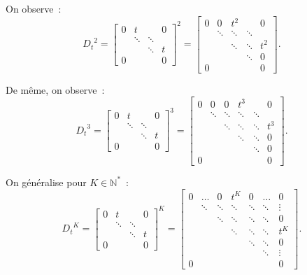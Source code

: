 \documentclass{report}
\theoremstyle{definition}
\theoremstyle{remark}
\numberwithin{equation}{section}
\newcommand{\N}{\mathbb N}
\newcommand{\Ns}{\N^{*}}
\begin{document}
			On observe~:
			\begin{equation}
				{D_t}^2 =
			\begin{bmatrix}
				0 & t & & 0 \\
				  & \ddots & \ddots & \\
				  & & \ddots & t \\
				0 & & & 0
			\end{bmatrix}^2 =
			\begin{bmatrix}
				0 & 0 & t^2 & & 0 \\
				& \ddots & \ddots & \ddots & \\
				& & \ddots & \ddots & t^2 \\
				& & & \ddots & 0 \\
				0 & & & & 0
			\end{bmatrix}.
			\end{equation}

			De même, on observe~:
			\begin{equation}
				{D_t}^3 =
			\begin{bmatrix}
				0 & t & & 0 \\
				  & \ddots & \ddots & \\
				  & & \ddots & t \\
				0 & & & 0
			\end{bmatrix}^3 =
			\begin{bmatrix}
				0 & 0 & 0 & t^3 & & 0 \\
				& \ddots & \ddots & \ddots & \ddots & \\
				& & \ddots & \ddots & \ddots & t^3 \\
				& & & \ddots & \ddots & 0 \\
				& & & & \ddots & 0 \\
				0 & & & & & 0
			\end{bmatrix}.
			\end{equation}

			On généralise pour $K \in \Ns$~:
			\begin{equation}
				{D_t}^K =
			\begin{bmatrix}
				0 & t & & 0 \\
				  & \ddots & \ddots & \\
				  & & \ddots & t \\
				0 & & & 0
			\end{bmatrix}^K =
			\begin{bmatrix}
				0 & \ldots & 0 & t^K & 0 & \ldots & 0 \\
				& \ddots & \ddots & \ddots & \ddots & \ddots & \vdots \\
				& & \ddots & \ddots & \ddots & \ddots & 0 \\
				& & & \ddots & \ddots & \ddots & t^K \\
				& & & & \ddots & \ddots & 0 \\
				 & & & & & \ddots & \vdots \\
				0 & & & & & & 0
			\end{bmatrix}.
			\end{equation}  %
\end{document}
